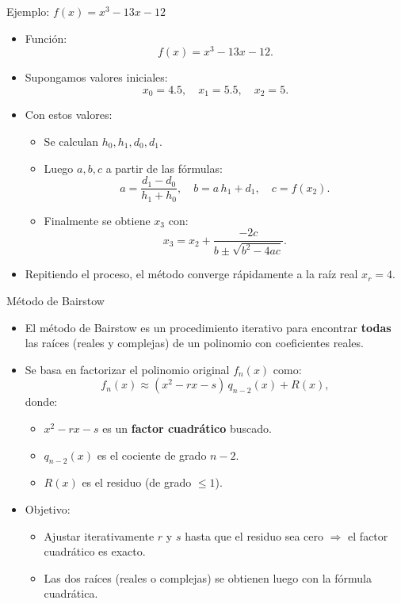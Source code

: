 \documentclass[../../main.tex]{subfiles}
\begin{document}
\begin{frame}{Ejemplo: \(f(x) = x^3 - 13x - 12\)}
  \begin{itemize}
    \item Función:
      \[
        f(x) = x^3 - 13x - 12.
      \]
    \item Supongamos valores iniciales:
      \[
        x_0 = 4.5, \quad x_1 = 5.5, \quad x_2 = 5.
      \]
    \item Con estos valores:
      \begin{itemize}
        \item Se calculan \(h_0, h_1, d_0, d_1\).
        \item Luego \(a, b, c\) a partir de las fórmulas:
          \[
            a = \frac{d_1 - d_0}{h_1 + h_0}, \quad
            b = a\,h_1 + d_1, \quad
            c = f(x_2).
          \]
        \item Finalmente se obtiene \(x_3\) con:
          \[
            x_3 = x_2 + \frac{-2c}{b \pm \sqrt{b^2 - 4ac}}.
          \]
      \end{itemize}
    \item Repitiendo el proceso, el método converge rápidamente
          a la raíz real \(x_r = 4\).
  \end{itemize}
\end{frame}

\begin{frame}{Método de Bairstow}
  \begin{itemize}
    \item El método de Bairstow es un procedimiento iterativo para encontrar
          \textbf{todas} las raíces (reales y complejas) de un polinomio con coeficientes reales.
    \item Se basa en factorizar el polinomio original \(f_n(x)\) como:
      \[
        f_n(x) \approx (x^2 - r x - s)\, q_{n-2}(x) + R(x),
      \]
      donde:
      \begin{itemize}
        \item \(x^2 - r x - s\) es un \textbf{factor cuadrático} buscado.
        \item \(q_{n-2}(x)\) es el cociente de grado \(n-2\).
        \item \(R(x)\) es el residuo (de grado \(\leq 1\)).
      \end{itemize}
    \item Objetivo:
      \begin{itemize}
        \item Ajustar iterativamente \(r\) y \(s\) hasta que el residuo sea cero
              \(\Rightarrow\) el factor cuadrático es exacto.
        \item Las dos raíces (reales o complejas) se obtienen luego con la fórmula cuadrática.
      \end{itemize}
  \end{itemize}
\end{frame}
\end{document}
